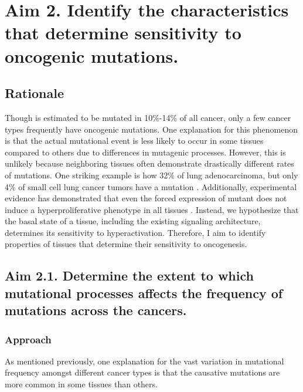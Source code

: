 \section{Aim 2. Identify the characteristics that determine sensitivity to oncogenic \KRAS{} mutations.}

\subsection*{Rationale}

Though \KRAS{} is estimated to be mutated in 10\%-14\% \cite{Bailey2018, Prior2020TheCancer} of all cancer, only a few cancer types frequently have oncogenic \KRAS{} mutations.
One explanation for this phenomenon is that the actual mutational event is less likely to occur in some tissues compared to others due to differences in mutagenic processes.
However, this is unlikely because neighboring tissues often demonstrate drastically different rates of \KRAS{} mutations.
One striking example is how 32\% of lung adenocarcinoma, but only 4\% of small cell lung cancer tumors have a \KRAS{} mutation \cite{Bailey2018, Prior2020TheCancer}.
Additionally, experimental evidence has demonstrated that even the forced expression of mutant \kras{} does not induce a hyperproliferative phenotype in all tissues \cite{Ray2011EpithelialModel,  Parikh2012MouseResponses}.
Instead, we hypothesize that the basal state of a tissue, including the existing signaling architecture, determines its sensitivity to \KRAS{} hyperactivation.
Therefore, I aim to identify properties of tissues that determine their sensitivity to \KRAS{} oncogenesis.


\subsection*{Aim 2.1. Determine the extent to which mutational processes affects the frequency of \KRAS{} mutations across the cancers.}

\subsubsection*{Approach}

As mentioned previously, one explanation for the vast variation in \KRAS{} mutational frequency amongst different cancer types is that the causative mutations are more common in some tissues than others.

